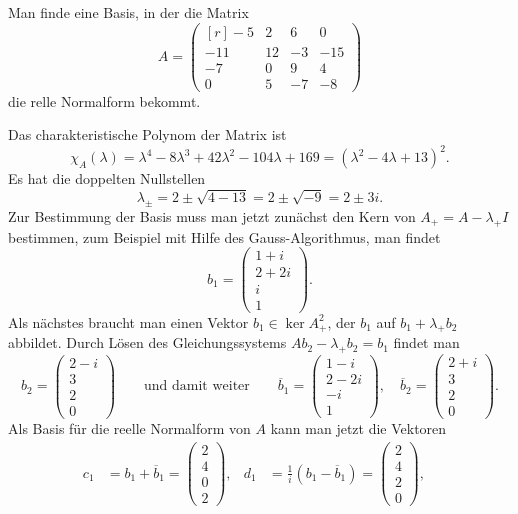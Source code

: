 Man finde eine Basis, in der die Matrix
\[
A=\begin{pmatrix*}[r]
 -5&  2&  6&   0\\
-11& 12& -3& -15\\
 -7&  0&  9&   4\\
  0&  5& -7&  -8
\end{pmatrix*}
\]
die relle Normalform bekommt.

\begin{loesung}
Das charakteristische Polynom der Matrix ist 
\[
\chi_{A}(\lambda)
=
\lambda^4-8\lambda^3+42\lambda^2-104\lambda+169
=
(\lambda^2-4\lambda+13)^2.
\]
Es hat die doppelten Nullstellen
\[
\lambda_\pm
=
2\pm \sqrt{4-13}
=
2\pm \sqrt{-9}
=
2\pm 3i.
\]
Zur Bestimmung der Basis muss man jetzt zunächst den Kern von 
$A_+=A-\lambda_+I$ bestimmen, zum Beispiel mit Hilfe des Gauss-Algorithmus,
man findet
\[
b_1
=
\begin{pmatrix}
1+i\\
2+2i\\
i\\
1
\end{pmatrix}.
\]
Als nächstes braucht man einen Vektor $b_1\in \ker A_+^2$, der 
$b_1$ auf $b_1+\lambda_+b_2$ abbildet.
Durch Lösen des Gleichungssystems $Ab_2-\lambda_+ b_2=b_1$ findet man
\[
b_2
=
\begin{pmatrix}
2-i\\3\\2\\0
\end{pmatrix}
\qquad\text{und damit weiter}\qquad
\overline{b}_1
=
\begin{pmatrix}
1-i\\
2-2i\\
-i\\
1
\end{pmatrix},\quad
\overline{b}_2
=
\begin{pmatrix}
2+i\\3\\2\\0
\end{pmatrix}.
\]
Als Basis für die reelle Normalform von $A$ kann man jetzt die Vektoren
\begin{align*}
c_1
&=
b_1+\overline{b}_1 = \begin{pmatrix}2\\4\\0\\2\end{pmatrix},&
d_1
&=
\frac{1}{i}(b_1-\overline{b}_1) = \begin{pmatrix}2\\4\\2\\0\end{pmatrix},&

\end{align*}
\end{loesung}
